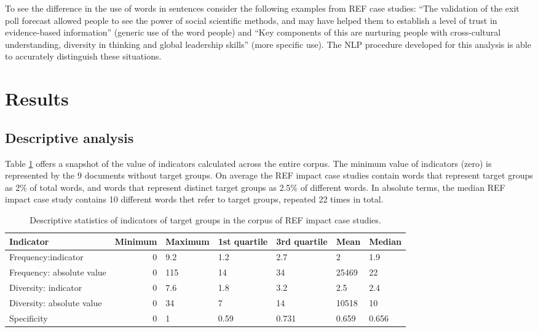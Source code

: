 \documentclass[]{book}
\begin{document}
To see the difference in the use of words in sentences consider the
following examples from REF case studies: ``The validation of the exit
poll forecast allowed people to see the power of social scientific
methods, and may have helped them to establish a level of trust in
evidence-based information'' (generic use of the word people) and ``Key
components of this are nurturing people with cross-cultural
understanding, diversity in thinking and global leadership skills''
(more specific use). The NLP procedure developed for this analysis is
able to accurately distinguish these situations.

\section{Results}\label{results-12}

\subsection{Descriptive analysis}\label{descriptive-analysis}

Table \ref{tab:impact2} offers a snapshot of the value of indicators
calculated across the entire corpus. The minimum value of indicators
(zero) is represented by the 9 documents without target groups. On
average the REF impact case studies contain words that represent target
groups as 2\% of total words, and words that represent distinct target
groups as 2.5\% of different words. In absolute terms, the median REF
impact case study contains 10 different words thet refer to target
groups, repeated 22 times in total.

\begin{table}

\caption{\label{tab:impact2}Descriptive statistics of indicators of target groups in the corpus of REF impact case studies.}
\centering
\begin{tabular}[t]{lrlllll}
\toprule
Indicator & Minimum & Maximum & 1st quartile & 3rd quartile & Mean & Median\\
\midrule
Frequency:indicator & 0 & 9.2 & 1.2 & 2.7 & 2 & 1.9\\
Frequency: absolute value & 0 & 115 & 14 & 34 & 25469 & 22\\
Diversity: indicator & 0 & 7.6 & 1.8 & 3.2 & 2.5 & 2.4\\
Diversity: absolute value & 0 & 34 & 7 & 14 & 10518 & 10\\
Specificity & 0 & 1 & 0.59 & 0.731 & 0.659 & 0.656\\
\bottomrule
\end{tabular}
\end{table}
\end{document}
